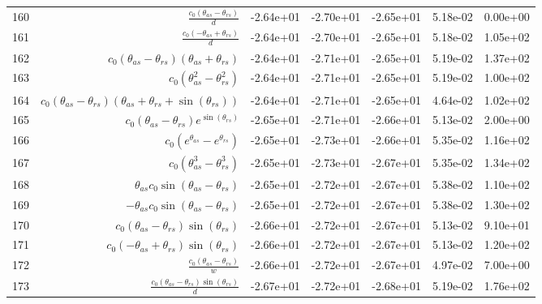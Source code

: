 \begin{tabularx}{\textwidth}{lRRRRRl}
160  &  $ \displaystyle\frac{c_{0} \left(\theta_{as} - \theta_{rs}\right)}{d} $  &  -2.64e+01  &  -2.70e+01  &  -2.65e+01  &  5.18e-02  &  0.00e+00  \\ 
161  &  $ \displaystyle\frac{c_{0} \left(- \theta_{as} + \theta_{rs}\right)}{d} $  &  -2.64e+01  &  -2.70e+01  &  -2.65e+01  &  5.18e-02  &  1.05e+02  \\ 
162  &  $ c_{0} \left(\theta_{as} - \theta_{rs}\right) \left(\theta_{as} + \theta_{rs}\right) $  &  -2.64e+01  &  -2.71e+01  &  -2.65e+01  &  5.19e-02  &  1.37e+02  \\ 
163  &  $ c_{0} \left(\theta_{as}^{2} - \theta_{rs}^{2}\right) $  &  -2.64e+01  &  -2.71e+01  &  -2.65e+01  &  5.19e-02  &  1.00e+02  \\ 
164  &  $ c_{0} \left(\theta_{as} - \theta_{rs}\right) \left(\theta_{as} + \theta_{rs} + \sin{\left(\theta_{rs} \right)}\right) $  &  -2.64e+01  &  -2.71e+01  &  -2.65e+01  &  4.64e-02  &  1.02e+02  \\ 
165  &  $ c_{0} \left(\theta_{as} - \theta_{rs}\right) e^{\sin{\left(\theta_{rs} \right)}} $  &  -2.65e+01  &  -2.71e+01  &  -2.66e+01  &  5.13e-02  &  2.00e+00  \\ 
166  &  $ c_{0} \left(e^{\theta_{as}} - e^{\theta_{rs}}\right) $  &  -2.65e+01  &  -2.73e+01  &  -2.66e+01  &  5.35e-02  &  1.16e+02  \\ 
167  &  $ c_{0} \left(\theta_{as}^{3} - \theta_{rs}^{3}\right) $  &  -2.65e+01  &  -2.73e+01  &  -2.67e+01  &  5.35e-02  &  1.34e+02  \\ 
168  &  $ \theta_{as} c_{0} \sin{\left(\theta_{as} - \theta_{rs} \right)} $  &  -2.65e+01  &  -2.72e+01  &  -2.67e+01  &  5.38e-02  &  1.10e+02  \\ 
169  &  $ - \theta_{as} c_{0} \sin{\left(\theta_{as} - \theta_{rs} \right)} $  &  -2.65e+01  &  -2.72e+01  &  -2.67e+01  &  5.38e-02  &  1.30e+02  \\ 
170  &  $ c_{0} \left(\theta_{as} - \theta_{rs}\right) \sin{\left(\theta_{rs} \right)} $  &  -2.66e+01  &  -2.72e+01  &  -2.67e+01  &  5.13e-02  &  9.10e+01  \\ 
171  &  $ c_{0} \left(- \theta_{as} + \theta_{rs}\right) \sin{\left(\theta_{rs} \right)} $  &  -2.66e+01  &  -2.72e+01  &  -2.67e+01  &  5.13e-02  &  1.20e+02  \\ 
172  &  $ \displaystyle\frac{c_{0} \left(\theta_{as} - \theta_{rs}\right)}{w} $  &  -2.66e+01  &  -2.72e+01  &  -2.67e+01  &  4.97e-02  &  7.00e+00  \\ 
173  &  $ \displaystyle\frac{c_{0} \left(\theta_{as} - \theta_{rs}\right) \sin{\left(\theta_{rs} \right)}}{d} $  &  -2.67e+01  &  -2.72e+01  &  -2.68e+01  &  5.19e-02  &  1.76e+02  \\ 

\end{tabularx}
